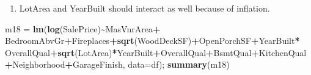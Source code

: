 \documentclass[
]{article}
\newenvironment{Shaded}{\begin{snugshade}}{\end{snugshade}}
\newcommand{\AttributeTok}[1]{\textcolor[rgb]{0.13,0.29,0.53}{#1}}
\newcommand{\FunctionTok}[1]{\textcolor[rgb]{0.13,0.29,0.53}{\textbf{#1}}}
\newcommand{\NormalTok}[1]{#1}
\newcommand{\OtherTok}[1]{\textcolor[rgb]{0.56,0.35,0.01}{#1}}
\newcommand{\SpecialCharTok}[1]{\textcolor[rgb]{0.81,0.36,0.00}{\textbf{#1}}}
\providecommand{\tightlist}{%
  \setlength{\itemsep}{0pt}\setlength{\parskip}{0pt}}
\begin{document}
\begin{enumerate}
\def\labelenumi{\arabic{enumi}.}
\setcounter{enumi}{1}
\tightlist
\item
  LotArea and YearBuilt should interact as well because of inflation.
\end{enumerate}

\begin{Shaded}
\begin{Highlighting}[]
\NormalTok{m18 }\OtherTok{=} \FunctionTok{lm}\NormalTok{(}\FunctionTok{log}\NormalTok{(SalePrice)}\SpecialCharTok{\textasciitilde{}}\NormalTok{MasVnrArea}\SpecialCharTok{+}
\NormalTok{          BedroomAbvGr}\SpecialCharTok{+}\NormalTok{Fireplaces}\SpecialCharTok{+}\FunctionTok{sqrt}\NormalTok{(WoodDeckSF)}\SpecialCharTok{+}\NormalTok{OpenPorchSF}\SpecialCharTok{+}\NormalTok{YearBuilt}\SpecialCharTok{*}
\NormalTok{           OverallQual}\SpecialCharTok{+}\FunctionTok{sqrt}\NormalTok{(LotArea)}\SpecialCharTok{*}\NormalTok{YearBuilt}\SpecialCharTok{+}\NormalTok{OverallQual}\SpecialCharTok{+}\NormalTok{BsmtQual}\SpecialCharTok{+}\NormalTok{KitchenQual}
         \SpecialCharTok{+}\NormalTok{Neighborhood}\SpecialCharTok{+}\NormalTok{GarageFinish, }\AttributeTok{data=}\NormalTok{df); }\FunctionTok{summary}\NormalTok{(m18)}
\end{Highlighting}
\end{Shaded}
\end{document}
